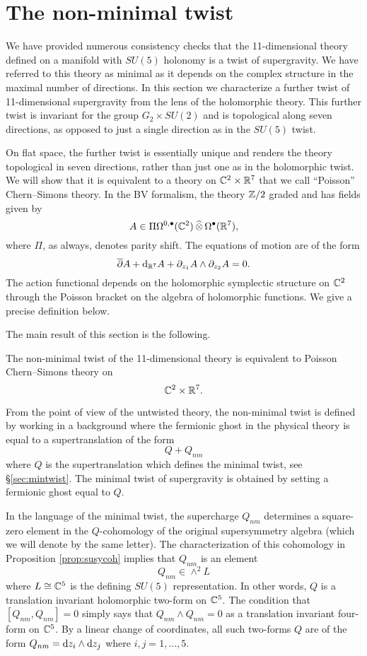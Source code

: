 \section{The non-minimal twist}\label{s:nonmin}

We have provided numerous consistency checks that the 11-dimensional theory defined on a manifold with $SU(5)$ holonomy is a twist of supergravity. 
We have referred to this theory as minimal as it depends on the complex structure in the maximal number of directions. 
In this section we characterize a further twist of 11-dimensional supergravity from the lens of the holomorphic theory.  
This further twist is invariant for the group $G_2 \times SU(2)$ and is topological along seven directions, as opposed to just a single direction as in the $SU(5)$ twist. 

On flat space, the further twist is essentially unique and renders the theory topological in seven directions, rather than just one as in the holomorphic twist. 
We will show that it is equivalent to a theory on $\mathbb C^2 \times \mathbb R^7$ that we call ``Poisson'' Chern--Simons theory. 
In the BV formalism, the theory $\mathbb Z/2$ graded and has fields given by
\[
A \in \Pi \Omega^{0,\bullet}(\mathbb C^2) \, \widehat{\otimes} \, \Omega^\bullet(\mathbb R^7) ,
\]
where $\Pi$, as always, denotes parity shift.
The equations of motion are of the form
\[
\overline{\partial} A + {\rm d}_{\mathbb R^7} A + \partial_{z_1} A \wedge \partial_{z_2} A = 0 .
\]
The action functional depends on the holomorphic symplectic structure on $\mathbb C^2$ through the Poisson bracket on the algebra of holomorphic functions.
We give a precise definition below. 

The main result of this section is the following.

\begin{thm}
\label{thm:nonmin}
The non-minimal twist of the 11-dimensional theory is equivalent to Poisson Chern--Simons theory on 
\[
\mathbb C^2 \times \mathbb R^7 .
\]
\end{thm}

From the point of view of the untwisted theory, the non-minimal twist is defined by working in a background where the fermionic ghost in the physical theory is equal to a supertranslation of the form
\[
Q + Q_{nm} 
\]
where $Q$ is the supertranslation which defines the minimal twist, see \S \ref{sec:mintwist}.
The minimal twist of supergravity is obtained by setting a fermionic ghost equal to $Q$. 

In the language of the minimal twist, the supercharge $Q_{nm}$ determines a square-zero element in the $Q$-cohomology of the original supersymmetry algebra (which we will denote by the same letter). 
The characterization of this cohomology in Proposition \ref{prop:susycoh} implies that $Q_{nm}$ is an element 
\[
Q_{nm} \in \wedge^2 L 
\]
where $L \cong \mathbb C^5$ is the defining $SU(5)$ representation. 
In other words, $Q$ is a translation invariant holomorphic two-form on $\mathbb C^5$. 
The condition that $[Q_{nm}, Q_{nm}] = 0$ simply says that $Q_{nm}\wedge Q_{nm} = 0$ as a translation invariant four-form on $\mathbb C^5$. 
By a linear change of coordinates, all such two-forms $Q$ are of the form $Q_{nm} = {\rm d} z_i \wedge {\rm d} z_j$ where $i,j=1,\ldots, 5$.

